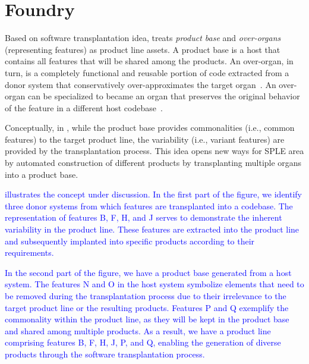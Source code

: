 \section{Foundry} 
\label{sec:approach}


Based on software transplantation idea, \FOUNDRY treats \emph{product base} and \emph{over-organs} (representing features) as product line assets. 
A product base is a host that contains all features that will be shared among the products. 
An over-organ, in turn, is a completely functional and reusable portion of code extracted from a donor system that conservatively over-approximates the target organ~\cite{Barr2015}. An over-organ can be specialized to became an organ that preserves the original behavior of the feature in a different host codebase~\cite{Barr2015}.

Conceptually, in \FOUNDRY, while the product base provides commonalities (i.e., common features) to the target product line, the variability (i.e., variant features) are provided by the transplantation process. This idea opens new ways for SPLE area by automated construction of different products by transplanting multiple organs into a product base. 

\textcolor{blue}{ illustrates the concept under discussion. In the first part of the figure, we identify three donor systems from which features are transplanted into a codebase. The representation of features B, F, H, and J serves to demonstrate the inherent variability in the product line. These features are extracted into the product line and subsequently implanted into specific products according to their requirements.}

\textcolor{blue}{In the second part of the figure, we have a product base generated from a host system. The features N and O in the host system symbolize elements that need to be removed during the transplantation process due to their irrelevance to the target product line or the resulting products. Features P and Q exemplify the commonality within the product line, as they will be kept in the product base and shared among multiple products. As a result, we have a product line comprising features B, F, H, J, P, and Q, enabling the generation of diverse products through the software transplantation process.}


